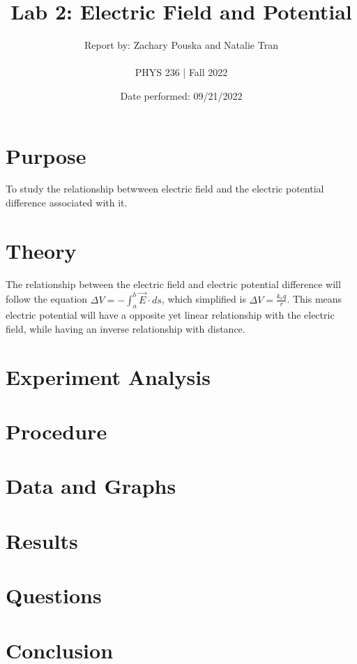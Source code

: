 \documentclass[titlepage]{article}
\begin{document}
\title{\textbf{Lab 2: Electric Field and Potential}}
\author{Report by: Zachary Pouska and  Natalie Tran \\ \\ 
PHYS 236 | Fall 2022}
\date{Date performed: 09/21/2022}

	\maketitle
	\section{Purpose}
	To study the relationship betwween electric field and the electric potential difference associated with it.
	\section{Theory}	
	The relationship between the electric field and electric potential difference will follow the equation \(\Delta V = -\int_{a}^{b} \vec{E} \cdot ds\), which simplified is \(\Delta V = \frac{k_{e}q}{r}\). This means electric potential will have a opposite yet linear relationship with the electric field, while having an inverse relationship with distance.
	\section{Experiment Analysis}
	\section{Procedure}
	\section{Data and Graphs}
	\section{Results}
	\section{Questions}
	\section{Conclusion}
	
\end{document}
